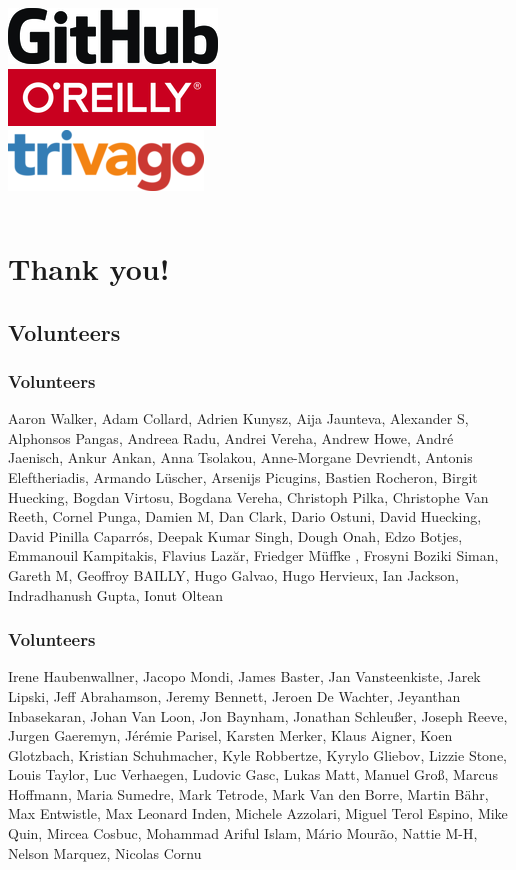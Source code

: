 \documentclass[aspectratio=169]{beamer}
\begin{document}
\begin{frame}
\begin{columns}[t]
		\vspace{0.5cm}
		\includegraphics[scale=0.5]{images/github.png}\\
		\vspace{0.5cm}
		\includegraphics[scale=0.4]{images/oreilly.png}\\
		\vspace{0.5cm}
		\includegraphics[scale=0.4]{images/trivago.png}
	\end{columns}
\end{frame}

\section{Thank you!}

\subsection{Volunteers}

\begin{frame}
	\frametitle{Volunteers}
	Aaron Walker, Adam Collard, Adrien Kunysz, Aija Jaunteva, Alexander S, Alphonsos Pangas, Andreea Radu, Andrei Vereha, Andrew Howe, André Jaenisch, Ankur Ankan, Anna Tsolakou, Anne-Morgane Devriendt, Antonis Eleftheriadis, Armando Lüscher, Arsenijs Picugins, Bastien Rocheron, Birgit Huecking, Bogdan Virtosu, Bogdana Vereha, Christoph Pilka, Christophe Van Reeth, Cornel Punga, Damien M, Dan Clark, Dario Ostuni, David Huecking, David Pinilla Caparrós, Deepak Kumar Singh, Dough Onah, Edzo Botjes, Emmanouil Kampitakis, Flavius Lazăr, Friedger  Müffke , Frosyni Boziki Siman, Gareth M, Geoffroy BAILLY, Hugo Galvao, Hugo Hervieux, Ian Jackson, Indradhanush Gupta, Ionut Oltean
\end{frame}

\begin{frame}
	\frametitle{Volunteers}
	Irene Haubenwallner, Jacopo Mondi, James Baster, Jan Vansteenkiste, Jarek Lipski, Jeff Abrahamson, Jeremy Bennett, Jeroen De Wachter, Jeyanthan Inbasekaran, Johan Van Loon, Jon Baynham, Jonathan Schleußer, Joseph Reeve, Jurgen Gaeremyn, Jérémie Parisel, Karsten Merker, Klaus Aigner, Koen Glotzbach, Kristian Schuhmacher, Kyle Robbertze, Kyrylo Gliebov, Lizzie Stone, Louis Taylor, Luc Verhaegen, Ludovic Gasc, Lukas Matt, Manuel Groß, Marcus Hoffmann, Maria Sumedre, Mark Tetrode, Mark Van den Borre, Martin Bähr, Max Entwistle, Max Leonard Inden, Michele Azzolari, Miguel Terol Espino, Mike Quin, Mircea Cosbuc, Mohammad Ariful Islam, Mário Mourão, Nattie M-H, Nelson Marquez, Nicolas Cornu
\end{frame}
\end{document}
